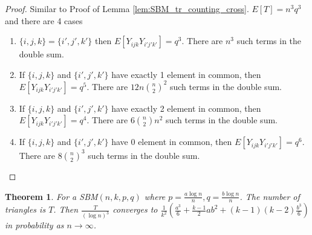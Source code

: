 \documentclass{ctexart}
\newtheorem{theorem}{Theorem}
\begin{document}
\begin{proof}
	Similar to Proof of Lemma \ref{lem:SBM_tr_counting_cross}.
	$E[T] = n^3 q^3$ and there are 4 cases
	\begin{enumerate}
	\item $\{i,j,k\} = \{i',j',k'\}$ then $E[Y_{ijk}Y_{i'j'k'}] = q^3$.
	There are $n^3$ such terms in the double sum.
	\item If $\{i,j,k\}$ and $\{i',j',k'\}$ have exactly 1 element in common, then $E[Y_{ijk}Y_{i'j'k'}] = q^5$.
	There are $12n\binom{n}{2}^2$ such terms in the double sum.
	\item If $\{i,j,k\}$ and $\{i',j',k'\}$ have exactly 2 element in common, then $E[Y_{ijk}Y_{i'j'k'}] = q^4$.
	There are $6\binom{n}{2}n^2$ such terms in the double sum.
	\item If $\{i,j,k\}$ and $\{i',j',k'\}$ have 0 element in common, then $E[Y_{ijk}Y_{i'j'k'}] = q^6$.
	There are $8\binom{n}{2}^3$ such terms in the double sum.		
\end{enumerate}	
\end{proof}
\begin{theorem}
	For a SBM$(n, k, p, q)$ where $p=\frac{a\log n}{n}, q = \frac{b\log n}{n}$. The number of triangles is $T$.
	Then $\frac{T}{(\log n)^3}$ converges to $\frac{1}{k^2}(\frac{a^3}{6} + \frac{k-1}{2}ab^2 + (k-1)(k-2)\frac{b^3}{6} )$ in probability as $n \to \infty$.
\end{theorem}
\end{document}
